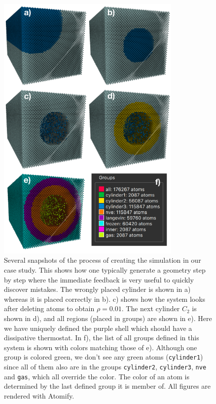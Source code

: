 \documentclass[12pt,a4paper,final]{iopart}
\newcommand{\code}[1]{\colorbox{light-gray}{\color{RawSienna}\texttt{#1}}}
\begin{document}
\begin{figure}
	\centering
	\includegraphics[width=0.8\textwidth]{figures/initial_configuration.pdf}
	\caption{
		Several snapshots of the process of creating the simulation in our case study.
		This shows how one typically generate a geometry step by step where the immediate
		feedback is very useful to quickly discover mistakes.
		The wrongly placed cylinder is shown in a) whereas it is placed correctly in b).
		c) shows how the system looks after deleting atoms to obtain $\rho = 0.01$. The next cylinder $C_2$ is shown in d),
		and all regions (placed in groups) are shown in e). Here we have uniquely defined the purple shell which should have a dissipative thermostat.
		In f), the list of all groups defined in this system is shown with colors matching those of e).
		Although one group is colored green, we don't see any green atoms (\code{cylinder1})
		since all of them also are in the groups \code{cylinder2}, \code{cylinder3}, \code{nve} and \code{gas},
		which all override the color. The color of an atom is determined by the last defined group it is member of.
		All figures are rendered with Atomify.
    }
	\label{fig:initial_configuration}
\end{figure}
\end{document}
